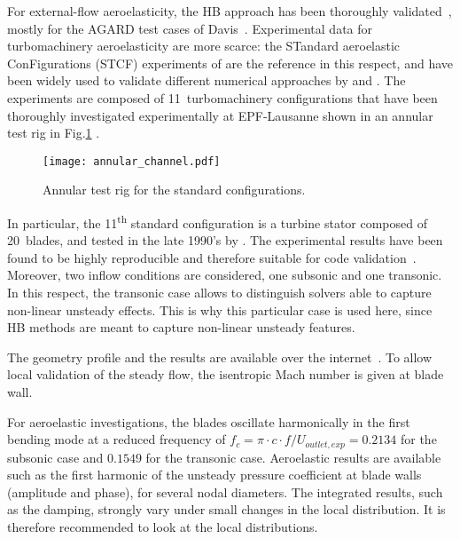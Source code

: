 
For external-flow aeroelasticity, the HB approach has 
been thoroughly validated~\cite{Gopinath2005, Woodgate2009, JDufour2009}, 
mostly for the AGARD test cases of Davis~\cite{Davis1982}.
Experimental data for turbomachinery aeroelasticity are more scarce: 
the STandard aeroelastic ConFigurations (STCF) experiments 
of \citet{Fransson1999} are the 
reference in this respect, and have been widely used 
to validate different numerical approaches by \citet{Sbardella2001,
Duta2002,Campobasso2003} and \citet{Cinnella2004}. The experiments
are composed of 11~turbomachinery configurations that have been
thoroughly  investigated experimentally at EPF-Lausanne shown in an 
annular test rig in Fig.\ref{fig:annular_channel} .
\begin{figure}[htbp]
  \centering
  \texttt{[image: annular\_channel.pdf]}
  \caption{Annular test rig for the standard configurations.}
  \label{fig:annular_channel}
\end{figure}

In particular, the 11\textsuperscript{th} standard configuration is a
turbine stator composed of 20~blades, and tested
in the late 1990's by \citet{Fransson1999}.
The experimental results have been found to be highly reproducible and
therefore suitable for code validation~\cite{Fransson1999}.  Moreover,
two inflow conditions are considered, one subsonic and one transonic.
In this respect, the transonic case allows to distinguish
solvers able to capture non-linear unsteady effects. This is why this particular
case is used here, since HB methods are meant to capture non-linear unsteady
features.

The geometry profile and the results are available over the
internet~\cite{stcf11web}.  To allow local validation of the steady
flow, the isentropic Mach number is given at blade wall.

For aeroelastic investigations, the blades oscillate harmonically in the first bending mode
at a reduced frequency of $f_{c} =\pi \cdot c \cdot
f/U_{outlet, exp} = 0.2134$ for the subsonic case and $0.1549$ for the
transonic case. Aeroelastic
results are available such as the first harmonic of the unsteady pressure
coefficient at blade walls (amplitude and phase), for several nodal
diameters. The integrated
results, such as the damping, strongly vary under small changes in the
local distribution. It is therefore recommended to look at the local
distributions.
